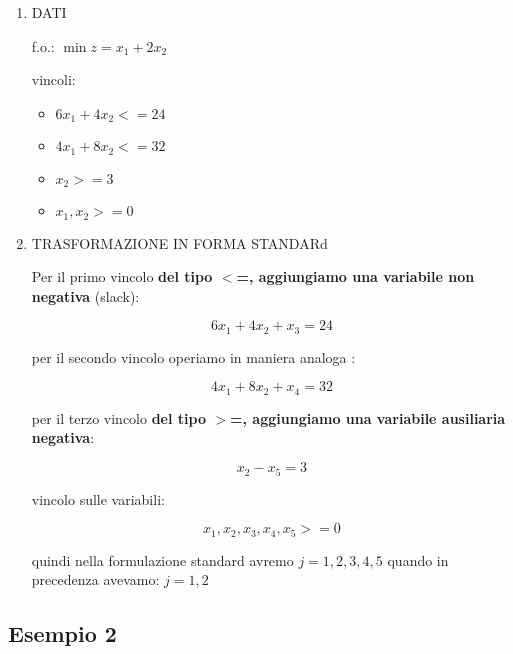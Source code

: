 \begin{enumerate}
	\item DATI
	
		f.o.: $\min z= x_1 + 2 x_2$

		vincoli:

		\begin{itemize}
			\item $6x_1 + 4x_2 <= 24$
			\item $4x_1 + 8x_2 <= 32$
			\item $x_2 >= 3$
			\item $x_1, x_2 >= 0$
		\end{itemize}
		
	\item TRASFORMAZIONE IN FORMA STANDARd
	
		Per il primo vincolo \textbf{del tipo $<$=, aggiungiamo una variabile non negativa} (slack):

		$$6x_1 + 4x_2 + x_3 = 24$$

		per il secondo vincolo operiamo in maniera analoga :

		$$4x_1 + 8x_2 + x_4 = 32$$

		per il terzo vincolo \textbf{del tipo $>$=, aggiungiamo una variabile ausiliaria negativa}:
		
		$$x_2 - x_5 = 3$$

		vincolo sulle variabili:

		$$x_1, x_2, x_3, x_4, x_5 >= 0$$

		quindi nella formulazione standard avremo $j = 1,2,3,4,5$ quando in precedenza avevamo: $j = 1, 2$
	
\end{enumerate}


\subsection{Esempio 2}

